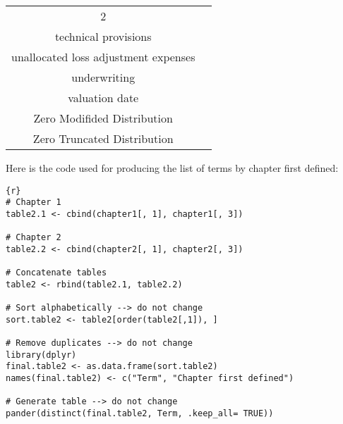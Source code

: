 \documentclass[
]{book}
\begin{document}
\begin{longtable}[]{@{}cc@{}}
\begin{minipage}[t]{0.31\columnwidth}
2\strut
\end{minipage}\tabularnewline
\begin{minipage}[t]{0.43\columnwidth}\centering
technical provisions\strut
\end{minipage} & \begin{minipage}[t]{0.31\columnwidth}\centering
1\strut
\end{minipage}\tabularnewline
\begin{minipage}[t]{0.43\columnwidth}\centering
unallocated loss adjustment
expenses\strut
\end{minipage} & \begin{minipage}[t]{0.31\columnwidth}\centering
1\strut
\end{minipage}\tabularnewline
\begin{minipage}[t]{0.43\columnwidth}\centering
underwriting\strut
\end{minipage} & \begin{minipage}[t]{0.31\columnwidth}\centering
1\strut
\end{minipage}\tabularnewline
\begin{minipage}[t]{0.43\columnwidth}\centering
valuation date\strut
\end{minipage} & \begin{minipage}[t]{0.31\columnwidth}\centering
1\strut
\end{minipage}\tabularnewline
\begin{minipage}[t]{0.43\columnwidth}\centering
Zero Modifided Distribution\strut
\end{minipage} & \begin{minipage}[t]{0.31\columnwidth}\centering
2\strut
\end{minipage}\tabularnewline
\begin{minipage}[t]{0.43\columnwidth}\centering
Zero Truncated Distribution\strut
\end{minipage} & \begin{minipage}[t]{0.31\columnwidth}\centering
2\strut
\end{minipage}\tabularnewline
\bottomrule
\end{longtable}

Here is the code used for producing the list of terms by chapter first defined:

\begin{verbatim}
{r}
# Chapter 1
table2.1 <- cbind(chapter1[, 1], chapter1[, 3])

# Chapter 2
table2.2 <- cbind(chapter2[, 1], chapter2[, 3])

# Concatenate tables
table2 <- rbind(table2.1, table2.2)

# Sort alphabetically --> do not change
sort.table2 <- table2[order(table2[,1]), ] 

# Remove duplicates --> do not change
library(dplyr)
final.table2 <- as.data.frame(sort.table2)
names(final.table2) <- c("Term", "Chapter first defined")

# Generate table --> do not change
pander(distinct(final.table2, Term, .keep_all= TRUE))
\end{verbatim}
\end{document}
